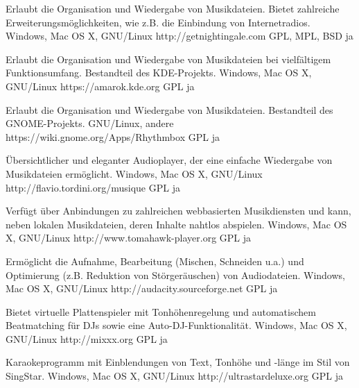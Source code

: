 





{Erlaubt die Organisation und Wiedergabe von Musikdateien. Bietet zahlreiche Erweiterungsmöglichkeiten, wie z.B. die Einbindung von Internetradios.}
{Windows, Mac OS X, GNU/Linux}
{http://getnightingale.com}
{GPL, MPL, BSD}
{ja}

{Erlaubt die Organisation und Wiedergabe von Musikdateien bei vielfältigem Funktionsumfang. Bestandteil des KDE-Projekts.}
{Windows, Mac OS X, GNU/Linux}
{https://amarok.kde.org}
{GPL}
{ja}

{Erlaubt die Organisation und Wiedergabe von Musikdateien. Bestandteil des GNOME-Projekts.}
{GNU/Linux, andere}
{https://wiki.gnome.org/Apps/Rhythmbox}
{GPL}
{ja}

{Übersichtlicher und eleganter Audioplayer, der eine einfache Wiedergabe von Musikdateien ermöglicht.}
{Windows, Mac OS X, GNU/Linux}
{http://flavio.tordini.org/musique}
{GPL}
{ja}

{Verfügt über Anbindungen zu zahlreichen webbasierten Musikdiensten und kann, neben lokalen Musikdateien, deren Inhalte nahtlos abspielen.}
{Windows, Mac OS X, GNU/Linux}
{http://www.tomahawk-player.org}  %
{GPL}
{ja}

{Ermöglicht die Aufnahme, Bearbeitung (Mischen, Schneiden u.a.) und Optimierung (z.B. Reduktion von Störgeräuschen) von Audiodateien.}
{Windows, Mac OS X, GNU/Linux}
{http://audacity.sourceforge.net}
{GPL}
{ja}

{Bietet virtuelle Plattenspieler mit Tonhöhenregelung und automatischem Beatmatching für DJs sowie eine Auto-DJ-Funktionalität.}
{Windows, Mac OS X, GNU/Linux}
{http://mixxx.org}
{GPL}
{ja}

{Karaokeprogramm mit Einblendungen von Text, Tonhöhe und -länge im Stil von SingStar.}
{Windows, Mac OS X, GNU/Linux}
{http://ultrastardeluxe.org}
{GPL}
{ja}


\backpage



